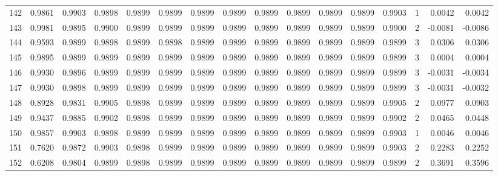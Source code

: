 \begin{tabular}{lrrrrrrrrrrrrrrr}
142 &      0.9861 &  0.9903 &  0.9898 &  0.9899 &  0.9899 &  0.9899 &  0.9899 &  0.9899 &  0.9899 &  0.9899 &   0.9899 &     0.9903 &      1 &                    0.0042 &                     0.0042 \\
143 &      0.9981 &  0.9895 &  0.9900 &  0.9899 &  0.9899 &  0.9899 &  0.9899 &  0.9899 &  0.9899 &  0.9899 &   0.9899 &     0.9900 &      2 &                   -0.0081 &                    -0.0086 \\
144 &      0.9593 &  0.9899 &  0.9898 &  0.9899 &  0.9898 &  0.9899 &  0.9899 &  0.9899 &  0.9899 &  0.9899 &   0.9899 &     0.9899 &      3 &                    0.0306 &                     0.0306 \\
145 &      0.9895 &  0.9899 &  0.9899 &  0.9899 &  0.9899 &  0.9899 &  0.9899 &  0.9899 &  0.9899 &  0.9899 &   0.9899 &     0.9899 &      3 &                    0.0004 &                     0.0004 \\
146 &      0.9930 &  0.9896 &  0.9899 &  0.9899 &  0.9899 &  0.9899 &  0.9899 &  0.9899 &  0.9899 &  0.9899 &   0.9899 &     0.9899 &      3 &                   -0.0031 &                    -0.0034 \\
147 &      0.9930 &  0.9898 &  0.9899 &  0.9899 &  0.9899 &  0.9899 &  0.9899 &  0.9899 &  0.9899 &  0.9899 &   0.9899 &     0.9899 &      3 &                   -0.0031 &                    -0.0032 \\
148 &      0.8928 &  0.9831 &  0.9905 &  0.9898 &  0.9899 &  0.9899 &  0.9899 &  0.9899 &  0.9899 &  0.9899 &   0.9899 &     0.9905 &      2 &                    0.0977 &                     0.0903 \\
149 &      0.9437 &  0.9885 &  0.9902 &  0.9898 &  0.9899 &  0.9899 &  0.9899 &  0.9899 &  0.9899 &  0.9899 &   0.9899 &     0.9902 &      2 &                    0.0465 &                     0.0448 \\
150 &      0.9857 &  0.9903 &  0.9898 &  0.9899 &  0.9899 &  0.9899 &  0.9899 &  0.9899 &  0.9899 &  0.9899 &   0.9899 &     0.9903 &      1 &                    0.0046 &                     0.0046 \\
151 &      0.7620 &  0.9872 &  0.9903 &  0.9898 &  0.9899 &  0.9899 &  0.9899 &  0.9899 &  0.9899 &  0.9899 &   0.9899 &     0.9903 &      2 &                    0.2283 &                     0.2252 \\
152 &      0.6208 &  0.9804 &  0.9899 &  0.9898 &  0.9899 &  0.9899 &  0.9899 &  0.9899 &  0.9899 &  0.9899 &   0.9899 &     0.9899 &      2 &                    0.3691 &                     0.3596 \\

\end{tabular}
